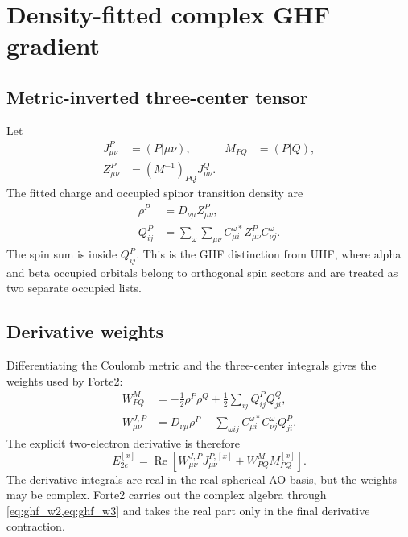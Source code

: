 \documentclass[aip,jcp,preprint]{revtex4-1}
\newcommand{\RePart}{\operatorname{Re}}
\newcommand{\xcoord}{{[x]}}
\begin{document}
\section{Density-fitted complex GHF gradient}

\subsection{Metric-inverted three-center tensor}

Let
\begin{align}
 J^P_{\mu\nu} &= (P|\mu\nu), & M_{PQ}&=(P|Q),\\
 Z^P_{\mu\nu} &= (M^{-1})_{PQ}J^Q_{\mu\nu}.
\end{align}
The fitted charge and occupied spinor transition density are
\begin{align}
 \rho^P
 &=D_{\nu\mu}Z^P_{\mu\nu},
 \label{eq:rho}\\
 Q^P_{ij}
 &=\sum_{\omega}\sum_{\mu\nu}
 C^{\omega *}_{\mu i}Z^P_{\mu\nu}C^\omega_{\nu j}.
 \label{eq:q_transition}
\end{align}
The spin sum is inside $Q^P_{ij}$.  This is the GHF distinction from UHF,
where alpha and beta occupied orbitals belong to orthogonal spin sectors and
are treated as two separate occupied lists.

\subsection{Derivative weights}

Differentiating the Coulomb metric and the three-center integrals gives the
weights used by Forte2:
\begin{align}
 W^M_{PQ}
 &=-\frac{1}{2}\rho^P\rho^Q
   +\frac{1}{2}\sum_{ij}Q^P_{ij}Q^Q_{ji},
 \label{eq:ghf_w2}\\
 W^{J,P}_{\mu\nu}
 &=D_{\nu\mu}\rho^P
   -\sum_{\omega ij}
    C^{\omega *}_{\mu i}C^\omega_{\nu j}Q^P_{ji}.
 \label{eq:ghf_w3}
\end{align}
The explicit two-electron derivative is therefore
\begin{equation}
 E^{\xcoord}_{2e}
 =\RePart\left[
 W^{J,P}_{\mu\nu}J^{P,\xcoord}_{\mu\nu}
 +W^M_{PQ}M^{\xcoord}_{PQ}
 \right].
 \label{eq:ghf_df_gradient}
\end{equation}
The derivative integrals are real in the real spherical AO basis, but the
weights may be complex.  Forte2 carries out the complex algebra through
\cref{eq:ghf_w2,eq:ghf_w3} and takes the real part only in the final derivative
contraction.
\end{document}
